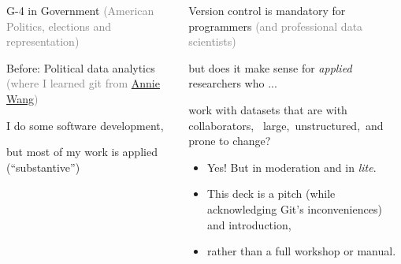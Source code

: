 \documentclass[ignorenonframetext, 10pt, aspectratio=169]{beamer}
\begin{document}
\begin{frame}{}

\begin{columns}[T]

\begin{column}{0.4\textwidth}
\begin{wideitemize}
\item G-4 in Government \textcolor{gray}{(American Politics, elections and representation)}
\item Before: Political data analytics \textcolor{gray}{(where I learned git from \href{https://anniejw.com/}{Annie Wang})}
\end{wideitemize}\pause
\bigskip
\begin{wideitemize}
\item I do some software development,
\item but most of my work is applied (``substantive'')
\end{wideitemize}
\end{column}\pause
\begin{column}{0.6\textwidth}
\begin{wideitemize}
\item Version control is mandatory for programmers \textcolor{gray}{(and professional data scientists)}\pause
\item but does it make sense for \emph{applied} researchers who ...
\item work with datasets that are \pause \alert{with collaborators}, ~\alert{large},\pause ~\alert{unstructured},\pause ~and \alert{prone to change}?
\end{wideitemize}\pause

\medskip
{}

\begin{tcolorbox}
\begin{itemize}
\item[{}] Yes! But in moderation and in \emph{lite}.
\item[{}] This deck is a  pitch (while acknowledging Git's inconveniences) and introduction,
\item[{}] rather than a full workshop or manual.
\end{itemize}
\end{tcolorbox}
\end{column}
\end{columns}
\end{frame}
\end{document}
